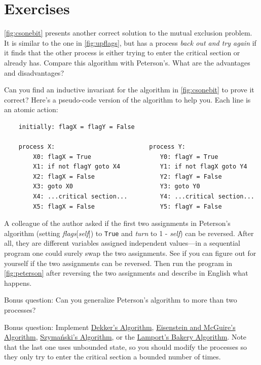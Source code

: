 \documentclass{report}
\newenvironment{code}{
\tcolorbox
}{
\endtcolorbox
}
\begin{document}
\section*{Exercises}
\begin{problems}
\item \autoref{fig:csonebit} presents another correct solution to the
mutual exclusion problem.  It is similar to the one in
\autoref{fig:upflags}, but has a process \emph{back out and try again}
if it finds that the other process is either trying to enter the critical
section or already has.  Compare this algorithm with Peterson's.  What are
the advantages and disadvantages?
\item
Can you find an inductive invariant for the algorithm in
\autoref{fig:csonebit} to prove it correct?
Here's a pseudo-code version of the algorithm to help you.  Each line
is an atomic action:
\begin{code}
\begin{verbatim}
    initially: flagX = flagY = False

    process X:                          process Y:
        X0: flagX = True                   Y0: flagY = True
        X1: if not flagY goto X4           Y1: if not flagX goto Y4
        X2: flagX = False                  Y2: flagY = False
        X3: goto X0                        Y3: goto Y0
        X4: ...critical section...         Y4: ...critical section...
        X5: flagX = False                  Y5: flagY = False
\end{verbatim}
\end{code}
\item A colleague of the author asked if the first two assignments in
Peterson's algorithm (setting \textit{flags}[\textit{self}])
to \texttt{True} and \textit{turn} to 1 - \textit{self}) can be reversed.
After all, they are different variables assigned independent values---in a
sequential program one could surely swap the two assignments.
See if you can figure out for yourself if the two assignments can be
reversed.  Then run the program in \autoref{fig:peterson} after reversing
the two assignments and describe in English what happens.
\item Bonus question:
Can you generalize Peterson's algorithm to more than two processes?
\item Bonus question:
Implement
\href{https://en.wikipedia.org/wiki/Dekker%27s_algorithm}{Dekker's Algorithm},
\href{https://en.wikipedia.org/wiki/Eisenberg_%26_McGuire_algorithm}{Eisenstein and McGuire's Algorithm},
\href{https://en.wikipedia.org/wiki/Szymanski%27s_algorithm}{Szymański's Algorithm}, or the
\href{https://en.wikipedia.org/wiki/Lamport%27s_bakery_algorithm}{Lamport's Bakery Algorithm}.
Note that the last one uses unbounded state, so you should modify the processes so they
only try to enter the critical section a bounded number of times.
\end{problems}
\end{document}
